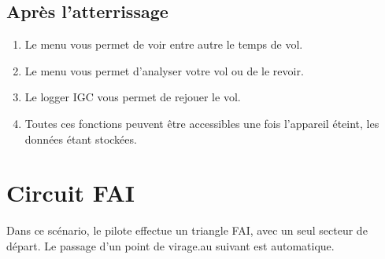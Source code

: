 \subsection*{Après l'atterrissage}
\begin{enumerate}
\item Le menu \blink{}vous permet de voir entre autre le temps de vol.
\item Le menu \blink{}vous permet d'analyser votre vol ou de le revoir. 
\item  Le logger IGC vous permet de rejouer le vol.
\item Toutes ces fonctions peuvent être accessibles une fois l'appareil éteint, les données étant stockées.
\end{enumerate}

\section{Circuit FAI}\label{sec:fai-task}

Dans ce scénario, le pilote effectue un triangle FAI, avec un seul secteur de départ. Le passage d'un point de virage.au suivant est automatique.

